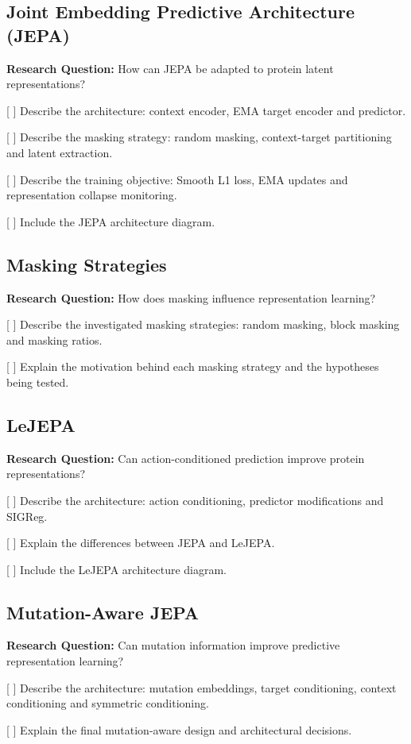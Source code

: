 \subsection{Joint Embedding Predictive Architecture (JEPA)}
\textbf{Research Question:} How can JEPA be adapted to protein latent representations?

[ ] Describe the architecture: context encoder, EMA target encoder and predictor.

[ ] Describe the masking strategy: random masking, context-target partitioning and latent extraction.

[ ] Describe the training objective: Smooth L1 loss, EMA updates and representation collapse monitoring.

[ ] Include the JEPA architecture diagram.

\subsection{Masking Strategies}
\textbf{Research Question:} How does masking influence representation learning?

[ ] Describe the investigated masking strategies: random masking, block masking and masking ratios.

[ ] Explain the motivation behind each masking strategy and the hypotheses being tested.

\subsection{LeJEPA}
\textbf{Research Question:} Can action-conditioned prediction improve protein representations?

[ ] Describe the architecture: action conditioning, predictor modifications and SIGReg.

[ ] Explain the differences between JEPA and LeJEPA.

[ ] Include the LeJEPA architecture diagram.

\subsection{Mutation-Aware JEPA}
\textbf{Research Question:} Can mutation information improve predictive representation learning?

[ ] Describe the architecture: mutation embeddings, target conditioning, context conditioning and symmetric conditioning.

[ ] Explain the final mutation-aware design and architectural decisions.

